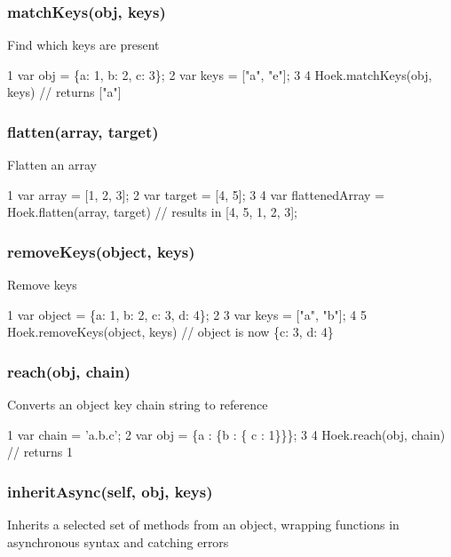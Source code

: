 \subsubsection*{match\+Keys(obj, keys)}

Find which keys are present


\begin{DoxyCode}
1 var obj = \{a: 1, b: 2, c: 3\};
2 var keys = ["a", "e"];
3 
4 Hoek.matchKeys(obj, keys) // returns ["a"]
\end{DoxyCode}


\subsubsection*{flatten(array, target)}

Flatten an array


\begin{DoxyCode}
1 var array = [1, 2, 3];
2 var target = [4, 5]; 
3 
4 var flattenedArray = Hoek.flatten(array, target) // results in [4, 5, 1, 2, 3];
\end{DoxyCode}


\subsubsection*{remove\+Keys(object, keys)}

Remove keys


\begin{DoxyCode}
1 var object = \{a: 1, b: 2, c: 3, d: 4\};
2 
3 var keys = ["a", "b"];
4 
5 Hoek.removeKeys(object, keys) // object is now \{c: 3, d: 4\}
\end{DoxyCode}


\subsubsection*{reach(obj, chain)}

Converts an object key chain string to reference


\begin{DoxyCode}
1 var chain = 'a.b.c';
2 var obj = \{a : \{b : \{ c : 1\}\}\};
3 
4 Hoek.reach(obj, chain) // returns 1
\end{DoxyCode}


\subsubsection*{inherit\+Async(self, obj, keys)}

Inherits a selected set of methods from an object, wrapping functions in asynchronous syntax and catching errors



